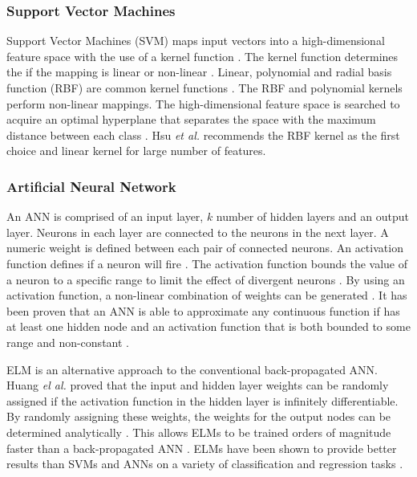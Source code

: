 \documentclass{sig-alternate-05-2015}
\begin{document}
	\subsubsection{Support Vector Machines}
	Support Vector Machines (SVM) maps input vectors into a high-dimensional feature space with the use of a kernel function \cite{Danenas20153194}. The kernel function determines the if the mapping is linear or non-linear \cite{Luo20097562}. Linear, polynomial and radial basis function (RBF) are common kernel functions \cite{hsu2003practical}. The RBF and polynomial kernels perform non-linear mappings. The high-dimensional feature space is searched to acquire an optimal hyperplane that separates the space with the maximum distance between each class \cite{Danenas20153194}. Hsu \textit{et al.} \cite{hsu2003practical} recommends the RBF kernel as the first choice and linear kernel for large number of features.
	
	\subsubsection{Artificial Neural Network}
	An ANN is comprised of an input layer, $k$ number of hidden layers and an output layer. Neurons in each layer are connected to the neurons in the next layer. A numeric weight is defined between each pair of connected neurons. An activation function defines if a neuron will fire \cite{Wang2003}. The activation function bounds the value of a neuron to a specific range to limit the effect of divergent neurons \cite{Wang2003}. By using an activation function, a non-linear combination of weights can be generated \cite{Wang2003}. It has been proven that an ANN is able to approximate any continuous function if has at least one hidden node and an activation function that is both bounded to some range and non-constant \cite{Hornik1991251}.
	
	ELM is an alternative approach to the conventional back-propagated ANN. Huang \textit{el al.} \cite{Huang2006489} proved that the input and hidden layer weights can be randomly assigned if the activation function in the hidden layer is infinitely differentiable. By randomly assigning these weights, the weights for the output nodes can be determined analytically \cite{Huang2006489}. This allows ELMs to be trained orders of magnitude faster than a back-propagated ANN \cite{6035797, Huang2006489}. ELMs have been shown to provide better results than SVMs and ANNs on a variety of classification and regression tasks \cite{6035797, Huang2006489}.
	
\end{document}
